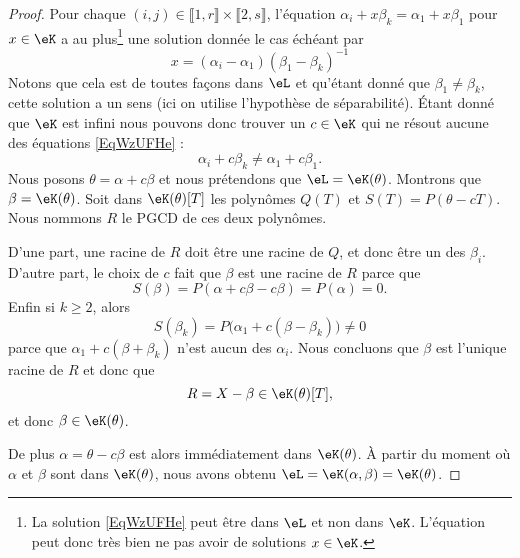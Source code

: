 \begin{proof}
    Pour chaque \( (i,j)\in\llbracket 1,r\rrbracket\times \llbracket 2,s\rrbracket\), l'équation \( \alpha_i+x\beta_k=\alpha_1+x\beta_1\) pour \( x\in \eK\) a au plus\footnote{La solution \eqref{EqWzUFHe} peut être dans \( \eL\) et non dans \( \eK\). L'équation peut donc très bien ne pas avoir de solutions \( x\in \eK\).} une solution donnée le cas échéant par
    \begin{equation}    \label{EqWzUFHe}
        x=(\alpha_i-\alpha_1)(\beta_1-\beta_k)^{-1}
    \end{equation}
    Notons que cela est de toutes façons dans \( \eL\) et qu'étant donné que \( \beta_1\neq \beta_k\), cette solution a un sens (ici on utilise l'hypothèse de séparabilité). Étant donné que \( \eK\) est infini nous pouvons donc trouver un \( c\in \eK\) qui ne résout aucune des équations \eqref{EqWzUFHe} :
    \begin{equation}
        \alpha_i+c\beta_k\neq \alpha_1+c\beta_1.
    \end{equation}
    Nous posons \( \theta=\alpha+c\beta\) et nous prétendons que \( \eL=\eK(\theta)\). Montrons que \( \beta=\eK(\theta)\). Soit dans \( \eK(\theta)[T]\) les polynômes \( Q(T)\) et \( S(T)=P(\theta-cT)\). Nous nommons \( R\) le PGCD de ces deux polynômes.
    
    D'une part, une racine de \( R\) doit être une racine de \( Q\), et donc être un des \( \beta_i\). D'autre part, le choix de \( c\) fait que \( \beta\) est une racine de \( R\) parce que
    \begin{equation}
        S(\beta)=P(\alpha+c\beta-c\beta)=P(\alpha)=0.
    \end{equation}
    Enfin si \( k\geq 2\), alors
    \begin{equation}
        S(\beta_k)=P\big(\alpha_1+c(\beta-\beta_k)\big)\neq 0
    \end{equation}
    parce que \( \alpha_1+c(\beta+\beta_k)\) n'est aucun des \( \alpha_i\). Nous concluons que \( \beta\) est l'unique racine de \( R\) et donc que 
    \begin{equation}
        R=X-\beta\in \eK(\theta)[T],
    \end{equation}
    et donc \( \beta\in \eK(\theta)\).

    De plus \( \alpha=\theta-c\beta\) est alors immédiatement dans \( \eK(\theta)\). À partir du moment où \( \alpha\) et \( \beta\) sont dans \( \eK(\theta)\), nous avons obtenu \( \eL=\eK(\alpha,\beta)=\eK(\theta)\).

\end{proof}

